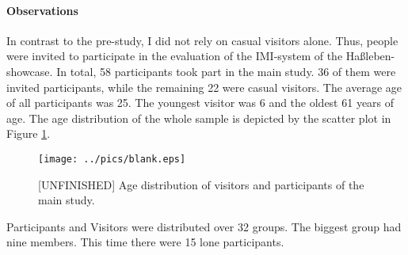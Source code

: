 \paragraph{Observations} In contrast to the pre-study, I did not rely on casual visitors alone. Thus, people were invited to participate in the evaluation of the \ac{IMI}-system of the Haßleben-showcase. In total, 58 participants took part in the main study. 36 of them were invited participants, while the remaining 22 were casual visitors. The average age of all participants was 25. The youngest visitor was 6 and the oldest 61 years of age. The age distribution of the whole sample is depicted by the scatter plot in Figure \ref{fig:main_study_ages}. 
\begin{figure}[H]%
\texttt{[image: ../pics/blank.eps]}%
\caption{[UNFINISHED] Age distribution of visitors and participants of the main study.}%
\label{fig:main_study_ages} %
\end{figure}

Participants and Visitors were distributed over 32 groups. The biggest group had nine members. This time there were 15 lone participants.

